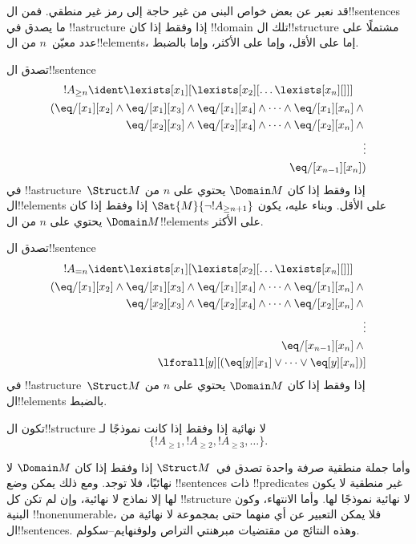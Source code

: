 \documentclass[../../../include/open-logic-section]{subfiles}
\begin{document}


\begin{explain}
قد نعبر عن بعض خواص البنى من غير حاجة إلى رمز غير منطقي.
فمن ال!!{sentence}s ما يصدق في !!a{structure} إذا وفقط إذا كان
!!{domain} تلك ال!!{structure} مشتملًا على عدد معيّن~$n$
من ال!!{element}s، إما على الأقل، وإما على الأكثر، وإما بالضبط.
\end{explain}

\begin{prop}
تصدق ال!!{sentence}
\begin{multline*}
  !A_{\ge n} \ident \lexists[x_1][\lexists[x_2][\dots\lexists[x_n][{}]]]\\
  \begin{aligned}
  (\eq/[x_1][x_2] \land {}
  \eq/[x_1][x_3] \land \eq/[x_1][x_4] \land \dots \land \eq/[x_1][x_n] \land {}\\
\eq/[x_2][x_3] \land \eq/[x_2][x_4] \land \dots \land {} \eq/[x_2][x_n] \land {} \\
\vdots\\
\eq/[x_{n-1}][x_n])
\end{aligned}
\end{multline*}
في !!a{structure}~$\Struct M$ إذا وفقط إذا كان $\Domain M$ يحتوي على
$n$ من ال!!{element}s على الأقل. وبناء عليه، يكون
$\Sat{M}{\lnot !A_{\ge n+1}}$ إذا وفقط إذا كان $\Domain M$ يحتوي على
$n$ من ال!!{element}s على الأكثر.

\end{prop}

\begin{prop}
تصدق ال!!{sentence}
\begin{multline*}
!A_{= n} \ident \lexists[x_1][\lexists[x_2][\dots\lexists[x_n][{}]]] \\
\begin{aligned}
  (\eq/[x_1][x_2] \land {}
  \eq/[x_1][x_3] \land \eq/[x_1][x_4] \land \dots \land \eq/[x_1][x_n] \land {}\\
\eq/[x_2][x_3] \land \eq/[x_2][x_4] \land \dots \land {} \eq/[x_2][x_n] \land {} \\
\vdots\\
\eq/[x_{n-1}][x_n] \land {} \\
\lforall[y][(\eq[y][x_1] \lor \dots \lor \eq[y][x_n])]
\end{aligned}
\end{multline*}
في !!a{structure}~$\Struct M$ إذا وفقط إذا كان $\Domain M$ يحتوي على
$n$ من ال!!{element}s بالضبط.
\end{prop}

\begin{prop}
تكون ال!!{structure} لا نهائية إذا وفقط إذا كانت نموذجًا لـ
\[
\{!A_{\ge 1}, !A_{\ge 2}, !A_{\ge 3}, \dots \}.
\]
\end{prop}

وأما جملة منطقية صرفة واحدة تصدق في~$\Struct M$ إذا وفقط إذا
كان $\Domain M$ لا نهائيًا، فلا توجد. ومع ذلك يمكن وضع
!!{sentence}s ذات !!{predicate}s غير منطقية لا يكون لها إلا
نماذج لا نهائية، وإن لم تكن كل !!{structure} لا نهائية نموذجًا لها.
وأما الانتهاء، وكون البنية !!{nonenumerable}، فلا يمكن التعبير
عن أي منهما حتى بمجموعة لا نهائية من ال!!{sentence}s.
وهذه النتائج من مقتضيات مبرهنتي التراص ولوفنهايم--سكولم.
\end{document}
